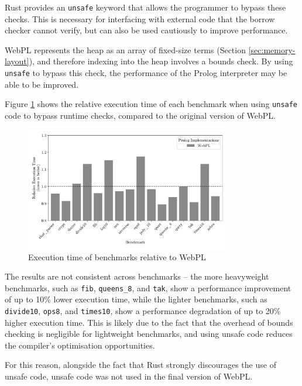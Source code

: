 Rust provides an \texttt{unsafe} keyword that allows the programmer to bypass these checks. This is necessary for interfacing with external code that the borrow checker cannot verify, but can also be used cautiously to improve performance.

WebPL represents the heap as an array of fixed-size terms (Section \ref{sec:memory-layout}), and therefore indexing into the heap involves a bounds check. By using \texttt{unsafe} to bypass this check, the performance of the Prolog interpreter may be able to be improved.

Figure \ref{fig:unsafe} shows the relative execution time of each benchmark when using \texttt{unsafe} code to bypass runtime checks, compared to the original version of WebPL.

\begin{figure}[H]
\centering
\includegraphics[width=0.8\textwidth]{relative_performance_unsafe.pdf}
\caption{Execution time of benchmarks relative to WebPL}
\label{fig:unsafe}
\end{figure}

The results are not consistent across benchmarks -- the more heavyweight benchmarks, such as \texttt{fib}, \texttt{queens\_8}, and \texttt{tak}, show a performance improvement of up to 10\% lower execution time, while the lighter benchmarks, such as \texttt{divide10}, \texttt{ops8}, and \texttt{times10}, show a performance degradation of up to 20\% higher execution time. This is likely due to the fact that the overhead of bounds checking is negligible for lightweight benchmarks, and using unsafe code reduces the compiler's optimisation opportunities.

For this reason, alongside the fact that Rust strongly discourages the use of unsafe code, unsafe code was not used in the final version of WebPL.

